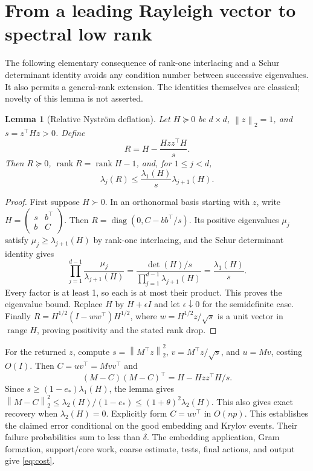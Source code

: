 \documentclass[11pt]{article}
\newtheorem{lemma}[theorem]{Lemma}
\newcommand{\norm}[1]{\left\lVert#1\right\rVert}
\newcommand{\rank}{\operatorname{rank}}
\newcommand{\range}{\operatorname{range}}
\newcommand{\diag}{\operatorname{diag}}
\begin{document}
\section{From a leading Rayleigh vector to spectral low rank}
The following elementary consequence of rank-one interlacing and a Schur
determinant identity avoids any condition number between successive eigenvalues.
It also permits a general-rank extension. The identities themselves are
classical; novelty of this lemma is not asserted.

\begin{lemma}[Relative Nystr\"om deflation]\label{lem:finish}
Let \(H\succeq0\) be \(d\times d\), \(\norm z_2=1\), and
\(s=z^\top Hz>0\). Define
\[
 R=H-\frac{Hz z^\top H}{s}.
\]
Then \(R\succeq0\), \(\rank R=\rank H-1\), and, for
\(1\leq j<d\),
\[
 \lambda_j(R)\leq\frac{\lambda_1(H)}s\lambda_{j+1}(H).
\]
\end{lemma}
\begin{proof}
First suppose \(H\succ0\). In an orthonormal basis starting with \(z\),
write \(H=\left(\begin{smallmatrix}s&b^\top\\b&C\end{smallmatrix}\right)\).
Then \(R=\diag(0,C-bb^\top/s)\). Its positive eigenvalues \(\mu_j\)
satisfy \(\mu_j\geq\lambda_{j+1}(H)\) by rank-one interlacing, and
the Schur determinant identity gives
\[
 \prod_{j=1}^{d-1}\frac{\mu_j}{\lambda_{j+1}(H)}
 =\frac{\det(H)/s}{\prod_{j=1}^{d-1}\lambda_{j+1}(H)}
 =\frac{\lambda_1(H)}s.
\]
Every factor is at least 1, so each is at most their product. This proves
the eigenvalue bound. Replace \(H\) by \(H+\epsilon I\) and let
\(\epsilon\downarrow0\) for the semidefinite case. Finally
\(R=H^{1/2}(I-ww^\top)H^{1/2}\), where
\(w=H^{1/2}z/\sqrt s\) is a unit vector in \(\range H\), proving
positivity and the stated rank drop.
\end{proof}

For the returned \(z\), compute \(s=\norm{M^\top z}_2^2\),
\(v=M^\top z/\sqrt s\), and \(u=Mv\), costing \(O(I)\).
Then \(C=uv^\top=Mvv^\top\) and
\[
 (M-C)(M-C)^\top=H-Hz z^\top H/s.
\]
Since \(s\geq(1-e_*)\lambda_1(H)\), the lemma gives
\(\norm{M-C}_2^2\leq\lambda_2(H)/(1-e_*)
 \leq(1+\theta)^2\lambda_2(H)\).
This also gives exact recovery when \(\lambda_2(H)=0\).
Explicitly form \(C=uv^\top\) in \(O(np)\). This establishes the claimed error
conditional on the good embedding and Krylov events. Their failure
probabilities sum to less than \(\delta\). The embedding application,
Gram formation, support/core work, coarse estimate, tests, final actions,
and output give \eqref{eq:cost}.
\end{document}
